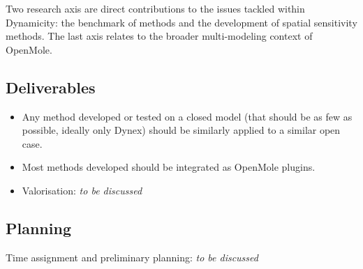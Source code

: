 Two research axis are direct contributions to the issues tackled within Dynamicity: the benchmark of methods and the development of spatial sensitivity methods. The last axis relates to the broader multi-modeling context of OpenMole.

\subsection{Deliverables} 

\begin{itemize}
\item Any method developed or tested on a closed model (that should be as few as possible, ideally only Dynex) should be similarly applied to a similar open case.
\item Most methods developed should be integrated as OpenMole plugins.
\item Valorisation: \textit{to be discussed}
\end{itemize}


\subsection{Planning}

Time assignment and preliminary planning: \textit{to be discussed}










